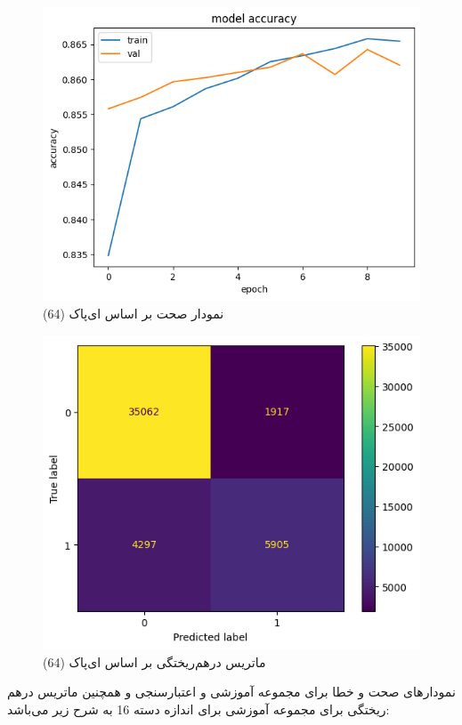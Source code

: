 \documentclass{article}
\begin{document}
\begin{figure}[!h]
    \centering\includegraphics[scale=.55]{./p5-5}
    \caption{نمودار صحت بر اساس ای‌پاک (64)}\label{fig.55}
\end{figure}

\begin{figure}[!h]
    \centering\includegraphics[scale=.55]{./p5-6}
    \caption{ماتریس درهم‌ریختگی بر اساس ای‌پاک (64)}\label{fig.56}
\end{figure}

\cleardoublepage

نمودارهای صحت و خطا برای مجموعه آموزشی و اعتبارسنجی و همچنین ماتریس درهم ریختگی برای مجموعه آموزشی برای اندازه دسته 16 به شرح زیر می‌باشد:
\end{document}
